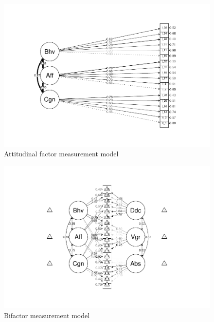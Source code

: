 \documentclass[
  english,
  man]{apa6}
\begin{document}
\begin{figure}
\centering
\includegraphics{SIOPpapaja_files/figure-latex/CFAatt2-1.pdf}
\caption{\label{fig:CFAatt2}Attitudinal factor measurement model}
\end{figure}

\begin{figure}
\centering
\includegraphics{SIOPpapaja_files/figure-latex/CFAatt3-1.pdf}
\caption{\label{fig:CFAatt3}Bifactor measurement model}
\end{figure}
\end{document}
